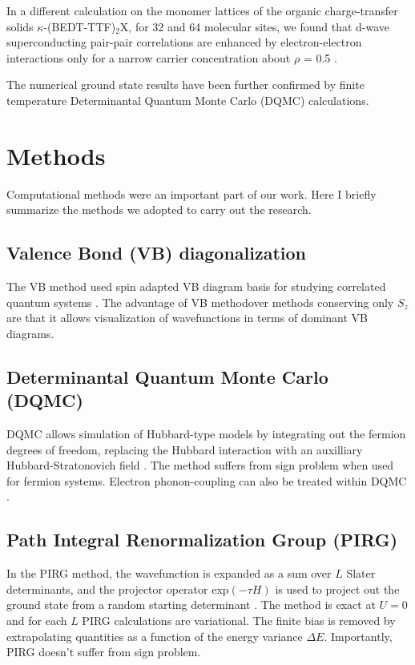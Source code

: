 \documentclass[a4paper,12pt]{article}
\begin{document}
In a different calculation  on the monomer lattices of the organic charge-transfer solids $\kappa$-(BEDT-TTF)$_{2}$X,  
for 32 and 64 molecular sites, we found that d-wave superconducting pair-pair correlations
are enhanced by electron-electron interactions only for a narrow carrier concentration about $\rho$ = 0.5 \cite{wpd2016}.


The numerical ground state results have been further confirmed by finite temperature Determinantal Quantum
Monte Carlo (DQMC) calculations. 


\section{Methods}
Computational methods were an important part of our work. Here I briefly summarize  the methods we adopted to carry out 
the research. 

\subsection{Valence Bond (VB) diagonalization}
The VB method used spin adapted VB diagram basis for studying correlated quantum systems \cite{ramashesha84b,ramashesha84a,ramashesha86a}. 
The advantage of VB methodover methods conserving only $S_{z}$ are that it allows visualization of wavefunctions in terms of dominant VB diagrams. 

\subsection{Determinantal Quantum Monte Carlo (DQMC)}
DQMC allows simulation of Hubbard-type models by integrating out the fermion degrees of freedom, replacing the Hubbard interaction
with an auxilliary Hubbard-Stratonovich field \cite{blankenbecler81a,loh92a}. The method suffers from sign problem when used for 
fermion systems. Electron phonon-coupling can also be treated within DQMC \cite{johnston13a}. 

\subsection{Path Integral Renormalization Group (PIRG)}
In the PIRG method, the wavefunction is expanded as a sum over $L$ Slater determinants, and the projector operator exp$(-\tau H)$
is used to project out the ground state from a random starting determinant \cite{kashima01b}. The method is exact at $U=0$ and for each 
$L$ PIRG calculations are variational. The finite bias is removed by extrapolating quantities as a function of the energy variance $\Delta E$.
Importantly, PIRG doesn't suffer from sign problem.
\end{document}
